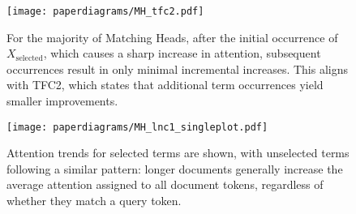 \begin{figure}[!ht]
    \centering
    \texttt{[image: paperdiagrams/MH\_tfc2.pdf]}
    \caption{For the majority of Matching Heads, after the initial occurrence of \( X_\text{selected} \), which causes a sharp increase in attention, subsequent occurrences result in only minimal incremental increases. This aligns with TFC2, which states that additional term occurrences yield smaller improvements.}

    \label{fig:MH_other_signals_tfcs}
\end{figure}

\begin{figure}[!ht]
    \centering
    \texttt{[image: paperdiagrams/MH\_lnc1\_singleplot.pdf]}
    \caption{Attention trends for selected terms are shown, with unselected terms following a similar pattern: longer documents generally increase the average attention assigned to all document tokens, regardless of whether they match a query token.}
    \label{fig:Discussion_doclen_attn}
    \vspace{-1em}
\end{figure}